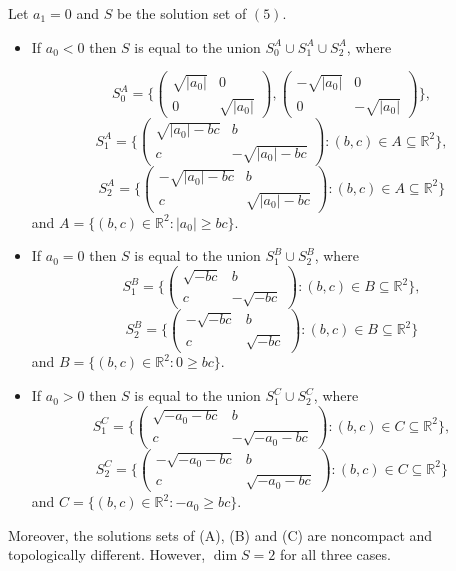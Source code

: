 \documentclass[10pt,a4paper]{amsart}
\begin{document}
\begin{lem} \label{lem_3} Let $a_1 = 0$ and $S$ be the solution set of $(5)$.
\begin{itemize}
\item[(A)] If $a_0 < 0$ then $S$ is equal to the union
$S^A_0 \cup S^A_1 \cup S^A_2$, where 

$$S^A_0 = \{\left(\begin{array}{rr}  \sqrt{|a_0|} & 0 \\ 0 & \sqrt{|a_0|}  \end{array}\right),
\left(\begin{array}{rr}  -\sqrt{|a_0|} & 0 \\ 0 & -\sqrt{|a_0|}  \end{array}\right)\},$$
$$S^A_1 = \{\left(\begin{array}{rr}  \sqrt{|a_0|-bc} & b \\ c & -\sqrt{|a_0|-bc}  \end{array}\right): (b,c) \in A \subseteq \mathbb R^2 \},$$
$$S^A_2 = \{\left(\begin{array}{rr}  -\sqrt{|a_0|-bc} & b \\ c & \sqrt{|a_0|-bc}  \end{array}\right): (b,c) \in A \subseteq \mathbb R^2 \}$$ and $A = \{(b,c) \in \mathbb R^2: |a_0| \geq bc \}$.

\item[(B)] If $a_0 = 0$ then $S$  is equal to the union
$S^B_1 \cup S^B_2$, where 
$$S^B_1 = \{\left(\begin{array}{rr}  \sqrt{-bc} & b \\ c & -\sqrt{-bc}  \end{array}\right): (b,c) \in B \subseteq \mathbb R^2 \},$$
$$S^B_2 = \{\left(\begin{array}{rr}  -\sqrt{-bc} & b \\ c & \sqrt{-bc}  \end{array}\right): (b,c) \in B \subseteq \mathbb R^2 \}$$ and $B= \{(b,c) \in \mathbb R^2: 0 \geq bc \}$.

\item[(C)] If $a_0 > 0$ then $S$  is equal to the union
$S^C_1 \cup S^C_2$, where 
$$S^C_1 = \{\left(\begin{array}{rr}  \sqrt{-a_0-bc} & b \\ c & -\sqrt{-a_0-bc}  \end{array}\right): (b,c) \in C \subseteq \mathbb R^2 \},$$
$$S^C_2 = \{\left(\begin{array}{rr}  -\sqrt{-a_0-bc} & b \\ c & \sqrt{-a_0-bc}  \end{array}\right): (b,c) \in C \subseteq \mathbb R^2 \}$$ and $C = \{(b,c) \in \mathbb R^2: -a_0 \geq bc \}$.
\end{itemize}
Moreover, the solutions sets of (A), (B) and (C) are noncompact and topologically different. However, $\dim S = 2$ for all three cases.
\end{lem}
\end{document}
